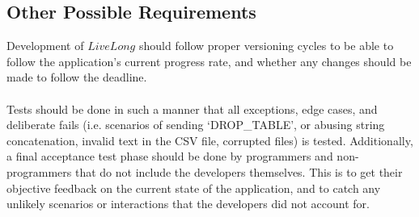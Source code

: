 \documentclass[12pt]{article}
\begin{document}
\subsection{Other Possible Requirements}
Development of $LiveLong$ should follow proper versioning cycles to be able to follow the application's current progress rate, and whether any changes should be made to follow the deadline. 
\\ \\
Tests should be done in such a manner that all exceptions, edge cases, and deliberate fails (i.e. scenarios of sending `DROP\_TABLE', or abusing string concatenation, invalid text in the CSV file, corrupted files) is tested. Additionally, a final acceptance test phase should be done by programmers and non-programmers that do not include the developers themselves. This is to get their objective feedback on the current state of the application, and to catch any unlikely scenarios or interactions that the developers did not account for.
\end{document}
